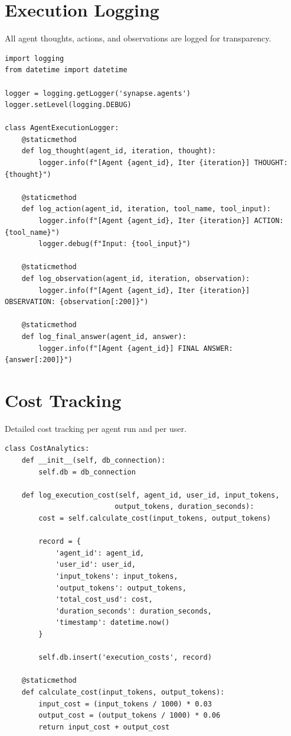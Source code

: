 \documentclass{report}
\begin{document}
\section{Execution Logging}

All agent thoughts, actions, and observations are logged for transparency.

\begin{lstlisting}
import logging
from datetime import datetime

logger = logging.getLogger('synapse.agents')
logger.setLevel(logging.DEBUG)

class AgentExecutionLogger:
    @staticmethod
    def log_thought(agent_id, iteration, thought):
        logger.info(f"[Agent {agent_id}, Iter {iteration}] THOUGHT: {thought}")
    
    @staticmethod
    def log_action(agent_id, iteration, tool_name, tool_input):
        logger.info(f"[Agent {agent_id}, Iter {iteration}] ACTION: {tool_name}")
        logger.debug(f"Input: {tool_input}")
    
    @staticmethod
    def log_observation(agent_id, iteration, observation):
        logger.info(f"[Agent {agent_id}, Iter {iteration}] OBSERVATION: {observation[:200]}")
    
    @staticmethod
    def log_final_answer(agent_id, answer):
        logger.info(f"[Agent {agent_id}] FINAL ANSWER: {answer[:200]}")
\end{lstlisting}

\section{Cost Tracking}

Detailed cost tracking per agent run and per user.

\begin{lstlisting}
class CostAnalytics:
    def __init__(self, db_connection):
        self.db = db_connection
    
    def log_execution_cost(self, agent_id, user_id, input_tokens, 
                          output_tokens, duration_seconds):
        cost = self.calculate_cost(input_tokens, output_tokens)
        
        record = {
            'agent_id': agent_id,
            'user_id': user_id,
            'input_tokens': input_tokens,
            'output_tokens': output_tokens,
            'total_cost_usd': cost,
            'duration_seconds': duration_seconds,
            'timestamp': datetime.now()
        }
        
        self.db.insert('execution_costs', record)
    
    @staticmethod
    def calculate_cost(input_tokens, output_tokens):
        input_cost = (input_tokens / 1000) * 0.03
        output_cost = (output_tokens / 1000) * 0.06
        return input_cost + output_cost
\end{lstlisting}
\end{document}
